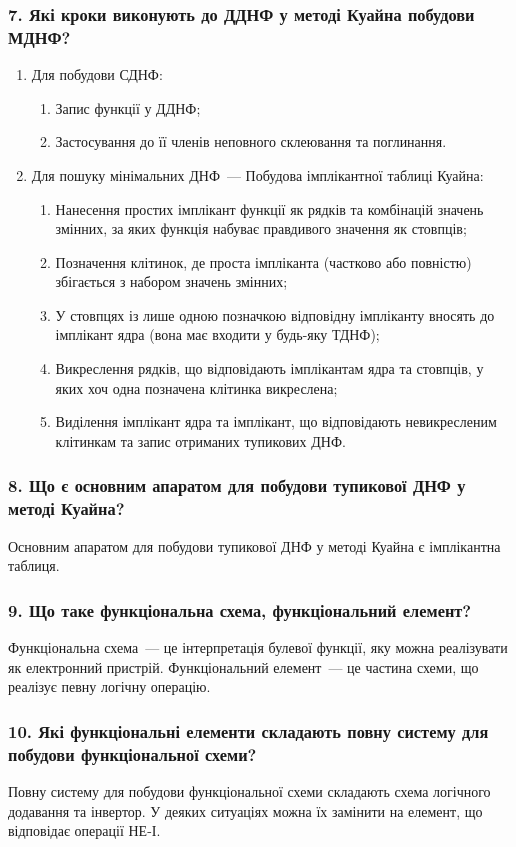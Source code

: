 \documentclass[14pt]{extreport}
\begin{document}
\subsubsection*{7. Які кроки виконують до ДДНФ у методі Куайна побудови МДНФ?}


\begin{enumerate}
	\item Для побудови СДНФ:
	\begin{enumerate}
		\item Запис функції у ДДНФ;
		\item Застосування до її членів неповного
			склеювання та поглинання.
	\end{enumerate}
	\item Для пошуку мінімальних ДНФ~---
		Побудова імплікантної таблиці Куайна:
	\begin{enumerate}
		\item Нанесення простих імплікант функції як
			рядків та комбінацій значень змінних, за яких
			функція набуває правдивого значення як
			стовпців;
		\item Позначення клітинок, де проста імпліканта
			(частково або повністю) збігається з
			набором значень змінних;
		\item У стовпцях із лише одною позначкою
			відповідну імпліканту вносять до
			імплікант ядра (вона має входити
			у будь-яку ТДНФ);
		\item Викреслення рядків, що відповідають
			імплікантам ядра та стовпців, у
			яких хоч одна позначена клітинка
			викреслена;
		\item Виділення імплікант ядра та імплікант,
			що відповідають невикресленим клітинкам
			та запис отриманих тупикових ДНФ.
	\end{enumerate}
\end{enumerate}


\subsubsection*{8. Що є основним апаратом для побудови тупикової ДНФ у методі Куайна?}

Основним апаратом для побудови тупикової ДНФ у методі Куайна є імплікантна таблиця.

\subsubsection*{9. Що таке функціональна схема, функціональний елемент?}

Функціональна схема~--- це інтерпретація булевої функції,
	яку можна реалізувати як електронний пристрій. Функціональний
	елемент~--- це частина схеми, що реалізує певну логічну операцію.

\subsubsection*{10. Які функціональні елементи складають повну систему для побудови
функціональної схеми?}

Повну систему для побудови функціональної схеми складають схема логічного
додавання та інвертор. У деяких ситуаціях можна їх замінити на елемент, що
відповідає операції НЕ-І.
\end{document}
